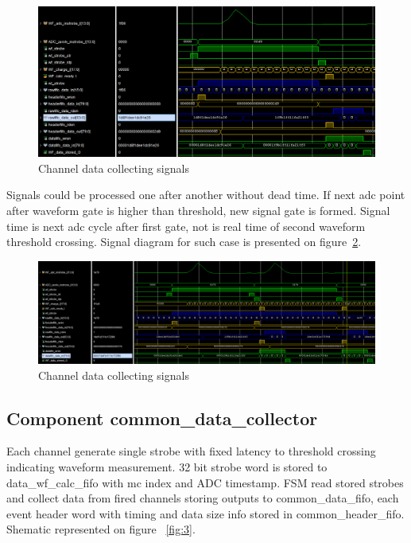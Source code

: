 \documentclass{article}
\begin{document}
\begin{figure}[H]
	\centering 
	\includegraphics[width=1.0\textwidth]{ADC_ch_data_collector_wave.png}
	\caption{\label{fig:4} Channel data collecting signals}
\end{figure}

Signals could be processed one after another without dead time. If next adc point after waveform gate is higher than threshold, new signal gate is formed. Signal time is next adc cycle after first gate, not is real time of second waveform threshold crossing. Signal diagram for such case is presented on figure~\ref{fig:5}.


\begin{figure}[H]
	\centering 
	\includegraphics[width=1.0\textwidth]{ADC_ch_data_collector_wave_pileup.png}
	\caption{\label{fig:5} Channel data collecting signals}
\end{figure}

\subsection{Component common\_data\_collector}
Each channel generate single strobe with fixed latency to threshold crossing indicating waveform measurement. 32 bit strobe word is stored to data\_wf\_calc\_fifo with mc index and ADC timestamp. FSM read stored strobes and collect data from fired channels storing outputs to common\_data\_fifo, each event header word with timing and data size info stored in common\_header\_fifo. Shematic represented on figure ~\ref{fig:3}.
\end{document}
